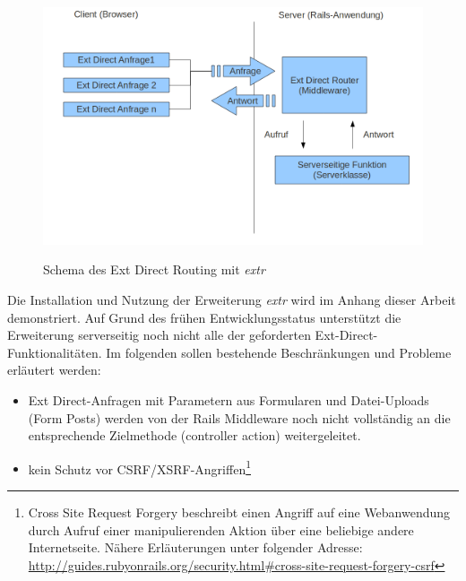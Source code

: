\begin{figure}[!ht]
\begin{center}
\label{fig.directrouter}
\includegraphics[scale=0.55]{images/rack/extdirect.png}
\caption{Schema des Ext Direct Routing mit \emph{extr}}
\end{center}
\end{figure}

Die Installation und Nutzung der Erweiterung \emph{extr} wird im Anhang dieser Arbeit demonstriert. Auf Grund des frühen Entwicklungsstatus unterstützt die Erweiterung serverseitig noch nicht alle der geforderten Ext-Direct-Funktionalitäten. Im folgenden sollen bestehende Beschränkungen und Probleme erläutert werden:
\begin{itemize}
\item
Ext Direct-Anfragen mit Parametern aus Formularen und Datei-Uploads (Form Posts) werden von der Rails Middleware noch nicht vollständig an die entsprechende Zielmethode (controller action) weitergeleitet.
\item
kein Schutz vor CSRF/XSRF-Angriffen\footnote{Cross Site Request Forgery beschreibt einen Angriff auf eine Webanwendung durch Aufruf einer manipulierenden Aktion über eine beliebige andere Internetseite. Nähere Erläuterungen unter folgender Adresse: \href{http://guides.rubyonrails.org/security.html\#cross-site-request-forgery-csrf}{http://guides.rubyonrails.org/security.html\#cross-site-request-forgery-csrf}}
\end{itemize}

